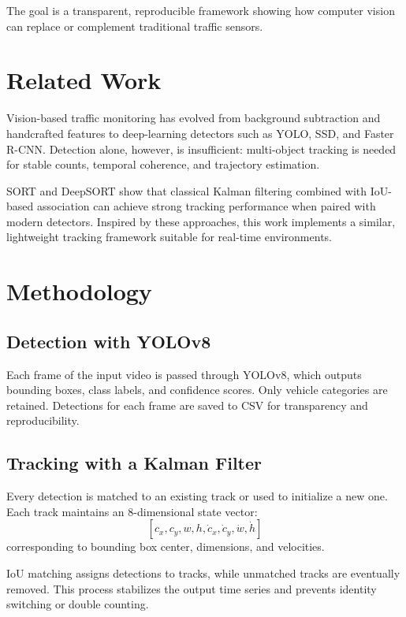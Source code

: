 \documentclass[12pt]{article}
\begin{document}
The goal is a transparent, reproducible framework showing how computer vision can replace or complement traditional traffic sensors.

\section{Related Work}
Vision-based traffic monitoring has evolved from background subtraction and handcrafted features to deep-learning detectors such as YOLO, SSD, and Faster R-CNN. Detection alone, however, is insufficient: multi-object tracking is needed for stable counts, temporal coherence, and trajectory estimation.

SORT and DeepSORT show that classical Kalman filtering combined with IoU-based association can achieve strong tracking performance when paired with modern detectors. Inspired by these approaches, this work implements a similar, lightweight tracking framework suitable for real-time environments.

\section{Methodology}

\subsection{Detection with YOLOv8}
Each frame of the input video is passed through YOLOv8, which outputs bounding boxes, class labels, and confidence scores. Only vehicle categories are retained. Detections for each frame are saved to CSV for transparency and reproducibility.

\subsection{Tracking with a Kalman Filter}
Every detection is matched to an existing track or used to initialize a new one. Each track maintains an 8-dimensional state vector:
\[
[c_x, c_y, w, h, \dot{c}_x, \dot{c}_y, \dot{w}, \dot{h}]
\]
corresponding to bounding box center, dimensions, and velocities.

IoU matching assigns detections to tracks, while unmatched tracks are eventually removed. This process stabilizes the output time series and prevents identity switching or double counting.
\end{document}
